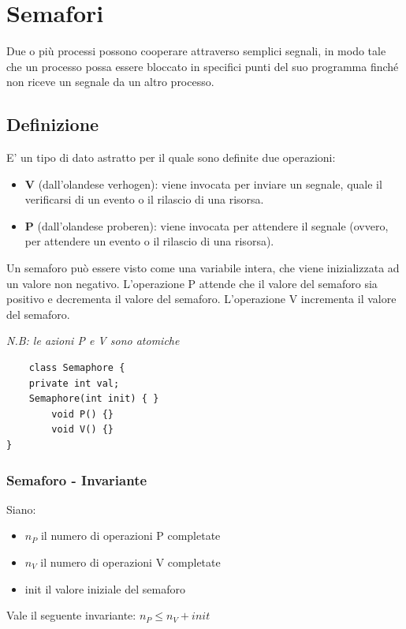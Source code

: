 \section{Semafori}
Due o più processi possono cooperare attraverso semplici segnali, in modo tale che un processo possa essere bloccato in specifici punti del suo programma finché non riceve un segnale da un altro processo.

\subsection{Definizione}
E' un tipo di dato astratto per il quale sono definite due operazioni:
\begin{itemize}
    \item  \textbf{V} (dall'olandese verhogen): viene invocata per inviare un segnale, quale il verificarsi di un evento o il rilascio di una risorsa.
    \item  \textbf{P} (dall'olandese proberen): viene invocata per attendere il segnale (ovvero, per attendere un evento o il rilascio di una risorsa).
\end{itemize}

Un semaforo può essere visto come una variabile intera, che viene inizializzata ad un valore non negativo.
L'operazione P attende che il valore del semaforo sia positivo e decrementa il valore del semaforo.
L'operazione V incrementa il valore del semaforo.

\textit{N.B: le azioni P e V sono atomiche}

\begin{lstlisting}
    class Semaphore {
    private int val;
    Semaphore(int init) { }
        void P() {}
        void V() {}
}
\end{lstlisting}

\subsubsection{Semaforo - Invariante}

Siano:
\begin{itemize}
    \item $n_P$ il numero di operazioni P completate
    \item $n_V$ il numero di operazioni V completate
    \item init il valore iniziale del semaforo
\end{itemize}

Vale il seguente invariante: $n_P \leq n_V + init$

